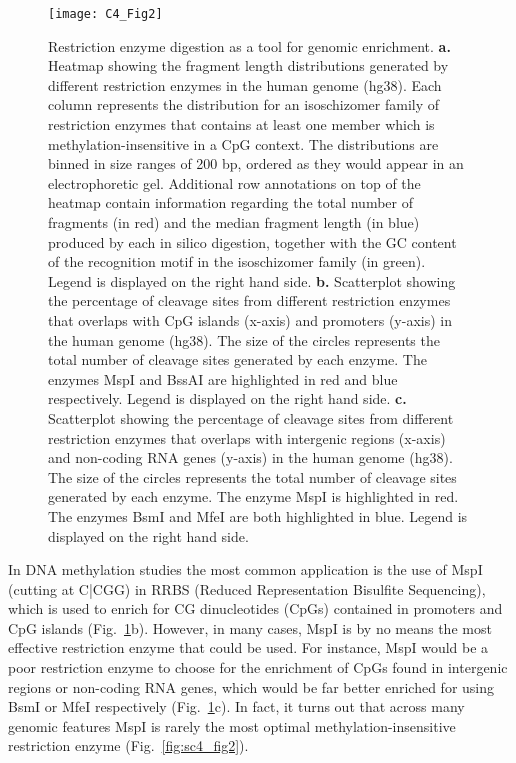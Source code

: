\begin{figure}[htbp!] 
	\centering    
	\texttt{[image: C4\_Fig2]}
	\vspace*{3mm}
	\caption[Restriction enzyme digestion as a tool for genomic enrichment]{Restriction enzyme digestion as a tool for genomic enrichment. \textbf{a.} Heatmap showing the fragment length distributions generated by different restriction enzymes in the human genome (\acrshort{hg38}). Each column represents the distribution for an isoschizomer family of restriction enzymes that contains at least one member which is methylation-insensitive in a CpG context. The distributions are binned in size ranges of 200 \acrshort{bp}, ordered as they would appear in an electrophoretic gel. Additional row annotations on top of the heatmap contain information regarding the total number of fragments (in red) and the median fragment length (in blue) produced by each in silico digestion, together with the GC content of the recognition motif in the isoschizomer family (in green). Legend is displayed on the right hand side. \textbf{b.} Scatterplot showing the percentage of cleavage sites from different restriction enzymes that overlaps with CpG islands (x-axis) and promoters (y-axis) in the human genome (hg38). The size of the circles represents the total number of cleavage sites generated by each enzyme. The enzymes MspI and BssAI are highlighted in red and blue respectively. Legend is displayed on the right hand side. \textbf{c.} Scatterplot showing the percentage of cleavage sites from different restriction enzymes that overlaps with intergenic regions (x-axis) and non-coding \acrshort{RNA} genes (y-axis) in the human genome (hg38). The size of the circles represents the total number of cleavage sites generated by each enzyme. The enzyme MspI is highlighted in red. The enzymes BsmI and MfeI are both highlighted in blue. Legend is displayed on the right hand side.}
	\label{fig:c4_fig2}
\end{figure}


In DNA methylation studies the most common application is the use of MspI (cutting at C|CGG) in RRBS (Reduced Representation Bisulfite Sequencing), which is used to enrich for CG dinucleotides (CpGs) contained in promoters and CpG islands \cite{Meissner2008} (Fig.~\ref{fig:c4_fig2}b). However, in many cases, MspI is by no means the most effective restriction enzyme that could be used. For instance, MspI would be a poor restriction enzyme to choose for the enrichment of CpGs found in intergenic regions or non-coding RNA genes, which would be far better enriched for using BsmI or MfeI respectively (Fig.~\ref{fig:c4_fig2}c). In fact, it turns out that across many genomic features MspI is rarely the most optimal methylation-insensitive restriction enzyme (Fig.~\ref{fig:sc4_fig2}). 

